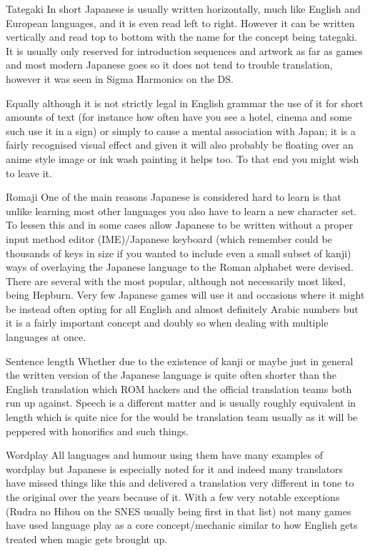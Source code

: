 \documentclass[
]{book}
\begin{document}
Tategaki In short Japanese is usually written horizontally, much like English and European languages, and it is even read left to right. However it can be written vertically and read top to bottom with the name for the concept being tategaki. It is usually only reserved for introduction sequences and artwork as far as games and most modern Japanese goes so it does not tend to trouble translation, however it was seen in Sigma Harmonics on the DS.

Equally although it is not strictly legal in English grammar the use of it for short amounts of text (for instance how often have you see a hotel, cinema and some such use it in a sign) or simply to cause a mental association with Japan; it is a fairly recognised visual effect and given it will also probably be floating over an anime style image or ink wash painting it helps too. To that end you might wish to leave it.

Romaji One of the main reasons Japanese is considered hard to learn is that unlike learning most other languages you also have to learn a new character set. To lessen this and in some cases allow Japanese to be written without a proper input method editor (IME)/Japanese keyboard (which remember could be thousands of keys in size if you wanted to include even a small subset of kanji) ways of overlaying the Japanese language to the Roman alphabet were devised. There are several with the most popular, although not necessarily most liked, being Hepburn. Very few Japanese games will use it and occasions where it might be instead often opting for all English and almost definitely Arabic numbers but it is a fairly important concept and doubly so when dealing with multiple languages at once.

Sentence length Whether due to the existence of kanji or maybe just in general the written version of the Japanese language is quite often shorter than the English translation which ROM hackers and the official translation teams both run up against. Speech is a different matter and is usually roughly equivalent in length which is quite nice for the would be translation team usually as it will be peppered with honorifics and such things.

Wordplay All languages and humour using them have many examples of wordplay but Japanese is especially noted for it and indeed many translators have missed things like this and delivered a translation very different in tone to the original over the years because of it. With a few very notable exceptions (Rudra no Hihou on the SNES usually being first in that list) not many games have used language play as a core concept/mechanic similar to how English gets treated when magic gets brought up.
\end{document}
